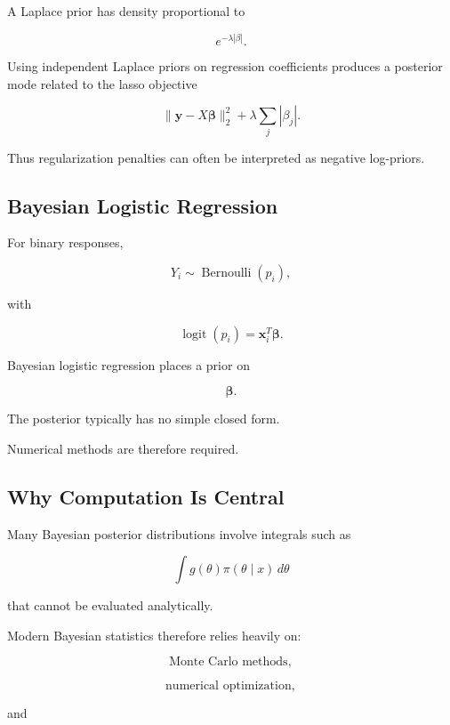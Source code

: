 A Laplace prior has density proportional to

\[
\boxed{
e^{-\lambda|\beta|}.
}
\]

Using independent Laplace priors on regression coefficients produces a
posterior mode related to the lasso objective

\[
\boxed{
\|\mathbf{y}-X\boldsymbol{\beta}\|_2^2
+
\lambda
\sum_j|\beta_j|.
}
\]

Thus regularization penalties can often be interpreted as negative
log-priors.

\subsection{Bayesian Logistic Regression}
\label{subsec:bayesian-logistic-regression}

For binary responses,

\[
Y_i
\sim
\operatorname{Bernoulli}(p_i),
\]

with

\[
\boxed{
\operatorname{logit}(p_i)
=
\mathbf{x}_i^T
\boldsymbol{\beta}.
}
\]

Bayesian logistic regression places a prior on

\[
\boldsymbol{\beta}.
\]

The posterior typically has no simple closed form.

Numerical methods are therefore required.

\subsection{Why Computation Is Central}
\label{subsec:why-bayesian-computation}

Many Bayesian posterior distributions involve integrals such as

\[
\boxed{
\int
g(\theta)
\pi(\theta\mid x)
\,d\theta
}
\]

that cannot be evaluated analytically.

Modern Bayesian statistics therefore relies heavily on:

\[
\boxed{
\text{Monte Carlo methods},
}
\]

\[
\boxed{
\text{numerical optimization},
}
\]

and

